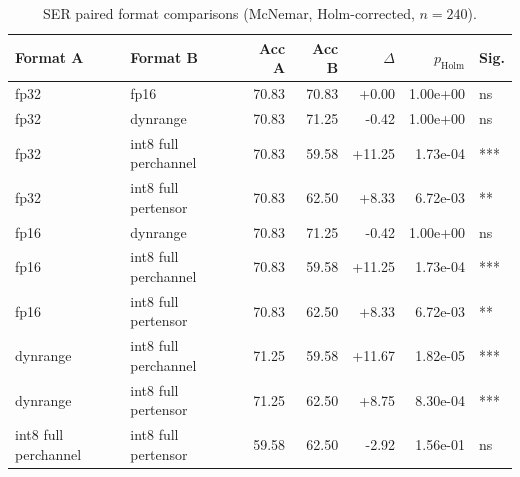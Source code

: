 \begin{table}[htbp]\centering
\caption{SER paired format comparisons (McNemar, Holm-corrected, $n=240$).}
\begin{tabular}{llrrrrl}
\hline
Format A & Format B & Acc A & Acc B & $\Delta$ & $p_{\mathrm{Holm}}$ & Sig. \\
\hline
fp32 & fp16 & 70.83 & 70.83 & +0.00 & 1.00e+00 & ns \\
fp32 & dynrange & 70.83 & 71.25 & -0.42 & 1.00e+00 & ns \\
fp32 & int8 full perchannel & 70.83 & 59.58 & +11.25 & 1.73e-04 & *** \\
fp32 & int8 full pertensor & 70.83 & 62.50 & +8.33 & 6.72e-03 & ** \\
fp16 & dynrange & 70.83 & 71.25 & -0.42 & 1.00e+00 & ns \\
fp16 & int8 full perchannel & 70.83 & 59.58 & +11.25 & 1.73e-04 & *** \\
fp16 & int8 full pertensor & 70.83 & 62.50 & +8.33 & 6.72e-03 & ** \\
dynrange & int8 full perchannel & 71.25 & 59.58 & +11.67 & 1.82e-05 & *** \\
dynrange & int8 full pertensor & 71.25 & 62.50 & +8.75 & 8.30e-04 & *** \\
int8 full perchannel & int8 full pertensor & 59.58 & 62.50 & -2.92 & 1.56e-01 & ns \\
\hline
\end{tabular}
\end{table}

